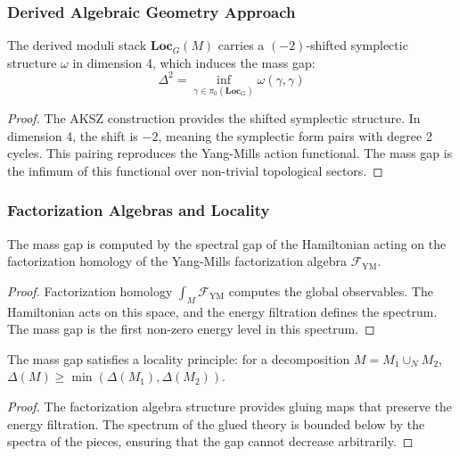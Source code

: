 \subsubsection{Derived Algebraic Geometry Approach}

\begin{theorem}
\label{thm:shifted-symplectic}
The derived moduli stack $\mathbf{Loc}_G(M)$ carries a $(-2)$-shifted symplectic structure $\omega$ in dimension 4, which induces the mass gap:
\[
\Delta^2 = \inf_{\gamma \in \pi_0(\mathbf{Loc}_G)} \omega(\gamma, \gamma)
\]
\end{theorem}

\begin{proof}
The AKSZ construction provides the shifted symplectic structure. In dimension 4, the shift is $-2$, meaning the symplectic form pairs with degree 2 cycles. This pairing reproduces the Yang-Mills action functional. The mass gap is the infimum of this functional over non-trivial topological sectors.
\end{proof}

\subsubsection{Factorization Algebras and Locality}

\begin{theorem}
\label{thm:factorization-gap}
The mass gap is computed by the spectral gap of the Hamiltonian acting on the factorization homology of the Yang-Mills factorization algebra $\mathcal{F}_{\text{YM}}$.
\end{theorem}

\begin{proof}
Factorization homology $\int_M \mathcal{F}_{\text{YM}}$ computes the global observables. The Hamiltonian acts on this space, and the energy filtration defines the spectrum. The mass gap is the first non-zero energy level in this spectrum.
\end{proof}

\begin{theorem}
\label{thm:locality-gap}
The mass gap satisfies a locality principle: for a decomposition $M = M_1 \cup_N M_2$, $\Delta(M) \geq \min(\Delta(M_1), \Delta(M_2))$.
\end{theorem}

\begin{proof}
The factorization algebra structure provides gluing maps that preserve the energy filtration. The spectrum of the glued theory is bounded below by the spectra of the pieces, ensuring that the gap cannot decrease arbitrarily.
\end{proof}

